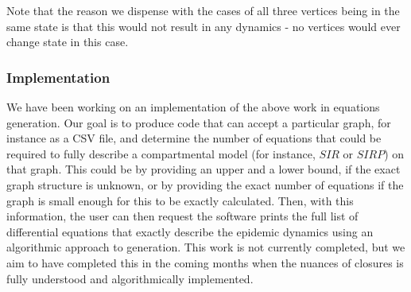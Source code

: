 \documentclass[../report.tex]{subfiles}
\begin{document}
Note that the reason we dispense with the cases of all three vertices being in the same state is that this would not result in any dynamics - no vertices would ever change state in this case. 

\subsubsection{Implementation}

We have been working on an implementation of the above work in equations generation. Our goal is to produce code that can accept a particular graph, for instance as a CSV file, and determine the number of equations that could be required to fully describe a compartmental model (for instance, $SIR$ or $SIRP$) on that graph. This could be by providing an upper and a lower bound, if the exact graph structure is unknown, or by providing the exact number of equations if the graph is small enough for this to be exactly calculated. Then, with this information, the user can then request the software prints the full list of differential equations that exactly describe the epidemic dynamics using an algorithmic approach to generation. This work is not currently completed, but we aim to have completed this in the coming months when the nuances of closures is fully understood and algorithmically implemented.
\end{document}
